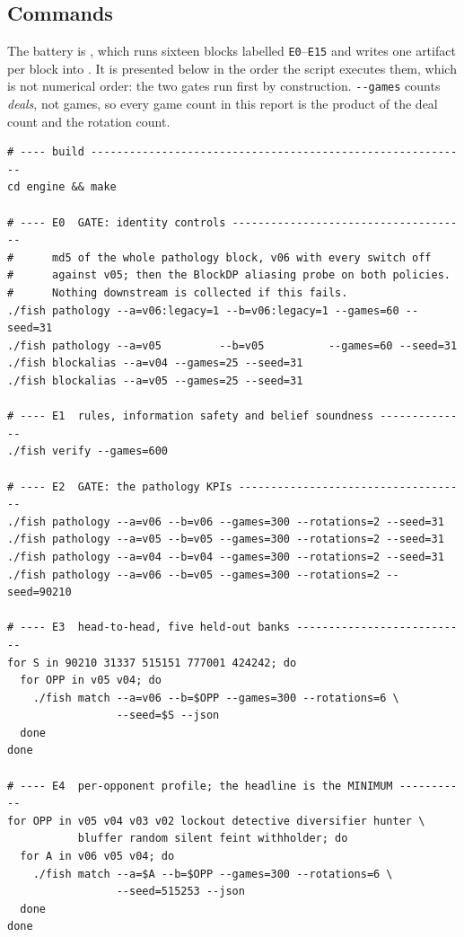 \subsection{Commands}
\label{app:repro-commands}

The battery is , which runs sixteen blocks
labelled \texttt{E0}--\texttt{E15} and writes one artifact per block into
. It is presented below in the order the script
executes them, which is not numerical order: the two gates run first by
construction. \texttt{-{}-games} counts \emph{deals}, not games, so every game
count in this report is the product of the deal count and the rotation count.

\begin{verbatim}
# ---- build -----------------------------------------------------------
cd engine && make

# ---- E0  GATE: identity controls -------------------------------------
#      md5 of the whole pathology block, v06 with every switch off
#      against v05; then the BlockDP aliasing probe on both policies.
#      Nothing downstream is collected if this fails.
./fish pathology --a=v06:legacy=1 --b=v06:legacy=1 --games=60 --seed=31
./fish pathology --a=v05         --b=v05          --games=60 --seed=31
./fish blockalias --a=v04 --games=25 --seed=31
./fish blockalias --a=v05 --games=25 --seed=31

# ---- E1  rules, information safety and belief soundness --------------
./fish verify --games=600

# ---- E2  GATE: the pathology KPIs ------------------------------------
./fish pathology --a=v06 --b=v06 --games=300 --rotations=2 --seed=31
./fish pathology --a=v05 --b=v05 --games=300 --rotations=2 --seed=31
./fish pathology --a=v04 --b=v04 --games=300 --rotations=2 --seed=31
./fish pathology --a=v06 --b=v05 --games=300 --rotations=2 --seed=90210

# ---- E3  head-to-head, five held-out banks ---------------------------
for S in 90210 31337 515151 777001 424242; do
  for OPP in v05 v04; do
    ./fish match --a=v06 --b=$OPP --games=300 --rotations=6 \
                 --seed=$S --json
  done
done

# ---- E4  per-opponent profile; the headline is the MINIMUM -----------
for OPP in v05 v04 v03 v02 lockout detective diversifier hunter \
           bluffer random silent feint withholder; do
  for A in v06 v05 v04; do
    ./fish match --a=$A --b=$OPP --games=300 --rotations=6 \
                 --seed=515253 --json
  done
done


\end{verbatim}
